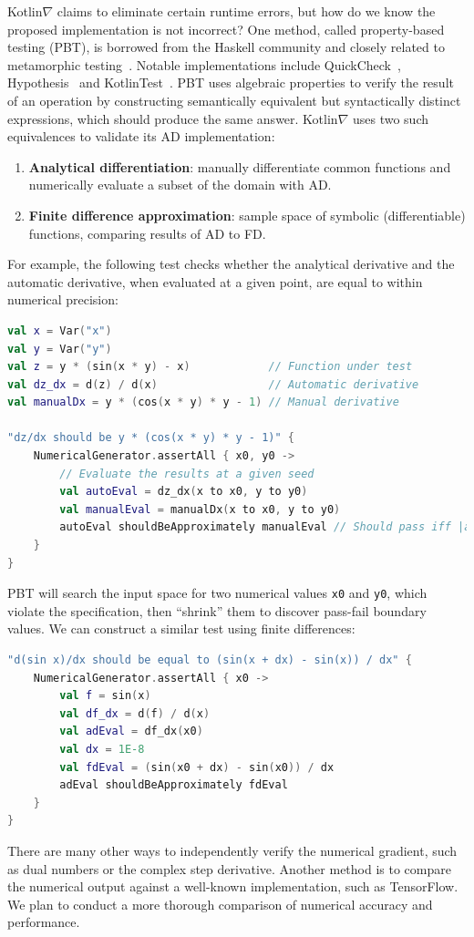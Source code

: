 \documentclass[12pt,initial,twoside,maitrise]{dms}
\def\inline{\lstinline[basicstyle=\ttfamily]}
\numberwithin{equation}{section}
\numberwithin{table}{chapter}
\numberwithin{figure}{chapter}
\begin{document}
Kotlin$\nabla$ claims to eliminate certain runtime errors, but how do we know the proposed implementation is not incorrect? One method, called property-based testing (PBT), is borrowed from the Haskell community and closely related to metamorphic testing~\cite{chen1998metamorphic}. Notable implementations include QuickCheck~\cite{claessen2011quickcheck}, Hypothesis~\cite{Hypothesis} and KotlinTest~\cite{kotlintest}. PBT uses algebraic properties to verify the result of an operation by constructing semantically equivalent but syntactically distinct expressions, which should produce the same answer. Kotlin$\nabla$ uses two such equivalences to validate its AD implementation: \\
%
\begin{enumerate}
    \item \textbf{Analytical differentiation}: manually differentiate common functions and numerically evaluate a subset of the domain with AD.
    \item \textbf{Finite difference approximation}: sample space of symbolic (differentiable) functions, comparing results of AD to FD. \\
\end{enumerate}
%
For example, the following test checks whether the analytical derivative and the automatic derivative, when evaluated at a given point, are equal to within numerical precision:
%
\begin{lstlisting}[language=Kotlin, showstringspaces=false]
val x = Var("x")
val y = Var("y")
val z = y * (sin(x * y) - x)            // Function under test
val dz_dx = d(z) / d(x)                 // Automatic derivative
val manualDx = y * (cos(x * y) * y - 1) // Manual derivative

"dz/dx should be y * (cos(x * y) * y - 1)" {
    NumericalGenerator.assertAll { x0, y0 ->
        // Evaluate the results at a given seed
        val autoEval = dz_dx(x to x0, y to y0)
        val manualEval = manualDx(x to x0, y to y0)
        autoEval shouldBeApproximately manualEval // Should pass iff |adEval - manualEval| < eps
    }
}
\end{lstlisting}
%
PBT will search the input space for two numerical values \inline{x0} and \inline{y0}, which violate the specification, then ``shrink'' them to discover pass-fail boundary values. We can construct a similar test using finite differences:
%
\begin{lstlisting}[language=Kotlin, showstringspaces=false]
"d(sin x)/dx should be equal to (sin(x + dx) - sin(x)) / dx" {
    NumericalGenerator.assertAll { x0 ->
        val f = sin(x)
        val df_dx = d(f) / d(x)
        val adEval = df_dx(x0)
        val dx = 1E-8
        val fdEval = (sin(x0 + dx) - sin(x0)) / dx
        adEval shouldBeApproximately fdEval
    }
}
\end{lstlisting}
%
There are many other ways to independently verify the numerical gradient, such as dual numbers or the complex step derivative. Another method is to compare the numerical output against a well-known implementation, such as TensorFlow. We plan to conduct a more thorough comparison of numerical accuracy and performance.
\end{document}
